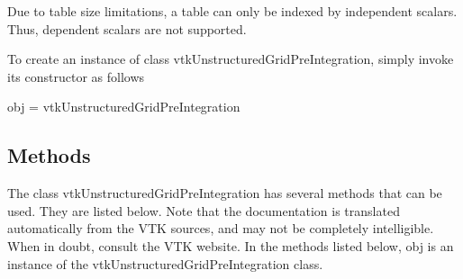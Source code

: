 Due to table size limitations, a table can only be indexed by independent scalars. Thus, dependent scalars are not supported.

To create an instance of class vtk\-Unstructured\-Grid\-Pre\-Integration, simply invoke its constructor as follows \begin{DoxyVerb}  obj = vtkUnstructuredGridPreIntegration
\end{DoxyVerb}
 \hypertarget{vtkwidgets_vtkxyplotwidget_Methods}{}\subsection{Methods}\label{vtkwidgets_vtkxyplotwidget_Methods}
The class vtk\-Unstructured\-Grid\-Pre\-Integration has several methods that can be used. They are listed below. Note that the documentation is translated automatically from the V\-T\-K sources, and may not be completely intelligible. When in doubt, consult the V\-T\-K website. In the methods listed below, {\ttfamily obj} is an instance of the vtk\-Unstructured\-Grid\-Pre\-Integration class. 
